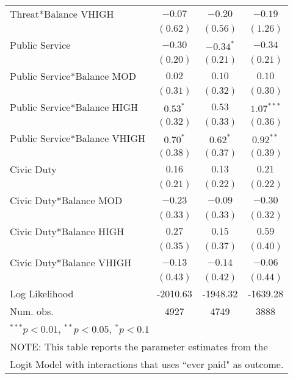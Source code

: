 \documentclass[12pt,titlepage]{article}
\begin{document}
\begin{table}[htbp]
\begin{center}
\begin{tabular}{|l|c|c|c|}
Threat*Balance VHIGH         & $-0.07$       & $-0.20$       & $-0.19$       \\
                             & $(0.62)$      & $(0.56)$      & $(1.26)$      \\
Public Service               & $-0.30$       & $-0.34^{*}$   & $-0.34$       \\
                             & $(0.20)$      & $(0.21)$      & $(0.21)$      \\
Public Service*Balance MOD   & $0.02$        & $0.10$        & $0.10$        \\
                             & $(0.31)$      & $(0.32)$      & $(0.30)$      \\
Public Service*Balance HIGH  & $0.53^{*}$    & $0.53$        & $1.07^{***}$  \\
                             & $(0.32)$      & $(0.33)$      & $(0.36)$      \\
Public Service*Balance VHIGH & $0.70^{*}$    & $0.62^{*}$    & $0.92^{**}$   \\
                             & $(0.38)$      & $(0.37)$      & $(0.39)$      \\
Civic Duty                   & $0.16$        & $0.13$        & $0.21$        \\
                             & $(0.21)$      & $(0.22)$      & $(0.22)$      \\
Civic Duty*Balance MOD       & $-0.23$       & $-0.09$       & $-0.30$       \\
                             & $(0.33)$      & $(0.33)$      & $(0.32)$      \\
Civic Duty*Balance HIGH      & $0.27$        & $0.15$        & $0.59$        \\
                             & $(0.35)$      & $(0.37)$      & $(0.40)$      \\
Civic Duty*Balance VHIGH     & $-0.13$       & $-0.14$       & $-0.06$       \\
                             & $(0.43)$      & $(0.42)$      & $(0.44)$      \\
\hline
Log Likelihood               & -2010.63      & -1948.32      & -1639.28      \\
Num. obs.                    & 4927          & 4749          & 3888          \\
\hline
\multicolumn{4}{l}{\scriptsize{$^{***}p<0.01$, $^{**}p<0.05$, $^*p<0.1$}} \\
\multicolumn{4}{l}{NOTE: This table reports the parameter estimates from the} \\
\multicolumn{4}{l}{Logit Model with interactions that uses ``ever paid" as outcome.} \\
\end{tabular}
\label{table:ep_log_II}
\end{center}
\end{table}
\end{document}
